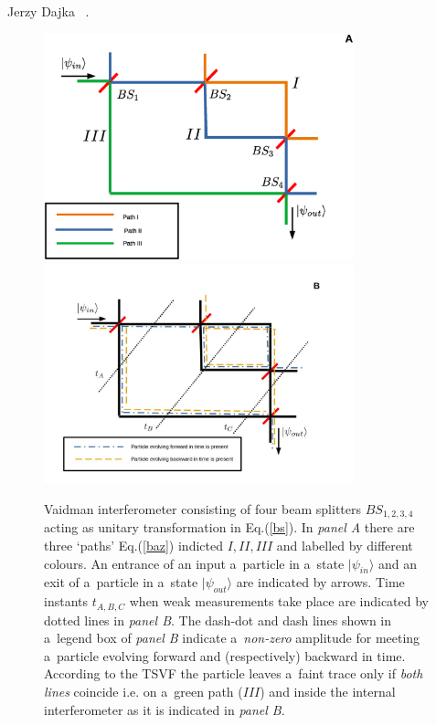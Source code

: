 \begin{artengenv}{Jerzy Dajka}
~\parencite{PhysRevA.95.032110,PhysRevA.97.046103,PhysRevA.97.046102,vaid_trans,lady}. 
\begin{figure}
\begin{center}
 \includegraphics[width=0.8\textwidth]{ART_dajka/vaid1a.eps}\\%
 \includegraphics[width=0.8\textwidth]{ART_dajka/vaid1b.jpg}%
\end{center}
 \caption{Vaidman  interferometer consisting of four beam splitters $BS_{1,2,3,4}$ acting as unitary transformation in Eq.(\ref{bs}). In  {\it panel A} there are  three `paths' Eq.(\ref{baz}) indicted  $I,II,III$ and labelled by different colours. An entrance of an input a~particle in a~state $|\psi_{in}\rangle$ and an exit of a~particle in a~state $|\psi_{out}\rangle$ are indicated by arrows. Time instants  $t_{A,B,C}$ when  weak measurements take place are indicated by dotted lines in  {\it panel B}. The dash-dot and dash lines shown in a~legend box of {\it panel B} indicate  a~{\it non-zero} amplitude for meeting a~particle evolving forward and (respectively) backward in time. According to the TSVF the particle leaves a~faint trace only if {\it both lines} coincide i.e. on a~green path ($III$) and inside the internal interferometer as it is indicated in {\it panel B}.}\label{fig0}
\end{figure}


\end{artengenv}
